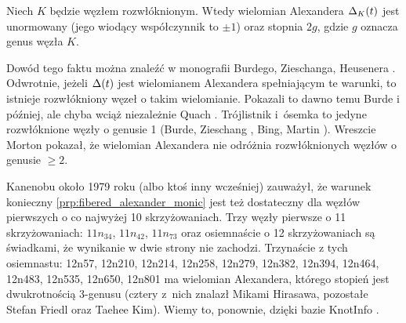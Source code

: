 \begin{proposition}
%
\label{prp:fibered_alexander_monic}%
    Niech $K$ będzie węzłem rozwłóknionym.
    Wtedy wielomian Alexandera $\Delta_K(t)$ jest unormowany (jego wiodący współczynnik to $\pm 1$) oraz stopnia $2g$, gdzie $g$ oznacza genus węzła $K$.
\end{proposition}

Dowód tego faktu można znaleźć w monografii Burdego, Zieschanga, Heusenera \cite[s. 130]{burde2014}.
Odwrotnie, jeżeli $\Delta(t)$ jest wielomianem Alexandera spełniającym te warunki, to istnieje rozwłókniony węzeł o takim wielomianie.
Pokazali to dawno temu Burde \cite{burde1966} i później, ale chyba wciąż niezależnie Quach \cite{quach1979}.
Trójlistnik i~ósemka to jedyne rozwłóknione węzły o genusie 1 (Burde, Zieschang \cite{burde1967}, Bing, Martin \cite{bing1971}).
Wreszcie Morton \cite{morton1983} pokazał, że wielomian Alexandera nie odróżnia rozwłóknionych węzłów o genusie $\ge 2$.


Kanenobu około 1979 roku (albo ktoś inny wcześniej) zauważył, że warunek konieczny \ref{prp:fibered_alexander_monic} jest też dostateczny dla węzłów pierwszych o co najwyżej 10 skrzyżowaniach.
Trzy węzły pierwsze o 11 skrzyżowaniach: $11n_{34}$, $11n_{42}$, $11n_{73}$ oraz osiemnaście o 12 skrzyżowaniach są świadkami, że wynikanie w dwie strony nie zachodzi.
Trzynaście z tych osiemnastu: 12n57, 12n210, 12n214, 12n258, 12n279, 12n382, 12n394, 12n464, 12n483, 12n535, 12n650, 12n801 ma wielomian Alexandera, którego stopień jest dwukrotnością 3-genusu (cztery z~nich znalazł Mikami Hirasawa, pozostałe Stefan Friedl oraz Taehee Kim).
%
%
%
Wiemy to, ponownie, dzięki bazie KnotInfo \cite{knotinfo2024}.

